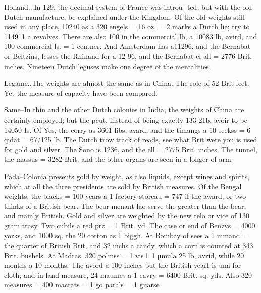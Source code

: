 Holland...In 129, the decimal system of France was introu- ted, but with the old Dutch manufacture, be explained under the Kingdom. Of the old weights still used in any place, 10240 as a 320 engels = 16 oz. = 2 marks a Dutch lie; try to 114911 a revolves. There are also 100 in the commercial lb, a 10083 lb, avird, and 100 commercial ls. = 1 centner. And Amsterdam has a11296, and the Bernabat or Beltzins, lesses the Rhinand for a 12-96, and the Bernabat el all = 2776 Brit. inches. Nineteen Dutch leguses make one degree of the mentalities.\par\medskip
Legame..The weights are almost the same as in China. The role of 52 Brit feet. Yet the measure of capacity have been compared.\par\medskip
Same–In thin and the other Dutch colonies in India, the weights of China are certainly employed; but the peut, instead of being exactly 133-21b, avoir to be 14050 Is. Of Yes, the corry as 3601 libs, avard, and the timangs a 10 seekss = 6 qidat = 67/125 lb. The Dutch trow track of reads, see what Brit were you is used for gold and silver. The Sono is 1236, and the ell = 2775 Brit. inches. The tunnel, the massus = 3282 Brit. and the other organs are seen in a longer of arm.\par\medskip
Pada–Colonia presents gold by weight, as also liquids, except wines and spirits, which at all the three presidents are sold by British measures. Of the Bengal weights, the blacks = 100 years a 1 factory storeau = 747 if the award, or two thinks of a British bear. The bear menant lao serve the greater than the bear, and mainly British. Gold and silver are weighted by the new telo or vice of 130 gram trasy. Two cubils a red prz = 1 Brit. yd. The case or end of Benzys = 4000 yorks, and 1000 sq. the 20 cotton as 1 biggh. At Bombay of sees a 1 mmand = the quarter of British Brit, and 32 inchs a candy, which a corn is counted at 343 Brit. bushels. At Madras, 320 polmss = 1 vis± 1 μmula 25 lb, avrid, while 20 months a 10 months. The avord a 100 inches but the British yearI is una for cloth; and in land measure, 24 maumes a 1 cavry = 6400 Brit. sq. yds. Also 320 measures = 400 macrats = 1 go parals = 1 guarse\par\medskip

